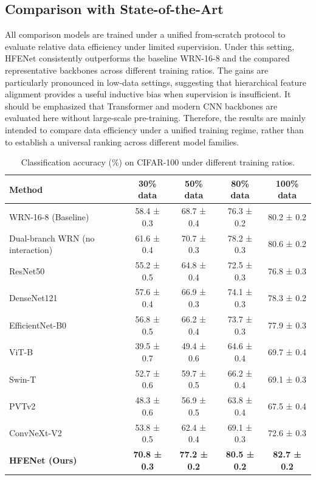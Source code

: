 \documentclass[pdflatex,sn-mathphys-num]{sn-jnl}
\theoremstyle{thmstyleone}%
\theoremstyle{thmstyletwo}%
\theoremstyle{thmstylethree}%
\begin{document}
\subsection{Comparison with State-of-the-Art}
All comparison models are trained under a unified from-scratch protocol to evaluate relative data efficiency under limited supervision. 
Under this setting, HFENet consistently outperforms the baseline WRN-16-8 and the compared representative backbones across different training ratios. 
The gains are particularly pronounced in low-data settings, suggesting that hierarchical feature alignment provides a useful inductive bias when supervision is insufficient. 
It should be emphasized that Transformer and modern CNN backbones are evaluated here without large-scale pre-training. 
Therefore, the results are mainly intended to compare data efficiency under a unified training regime, rather than to establish a universal ranking across different model families.

\begin{table}[htbp]
    \centering
    \caption{Classification accuracy (\%) on CIFAR-100 under different training ratios.}
    \label{tab:cifar100_data_ratio}
    \begin{tabular}{@{}lcccc@{}}
    \toprule
    \textbf{Method} & \textbf{30\% data} & \textbf{50\% data} & \textbf{80\% data} & \textbf{100\% data} \\
    \midrule
    WRN-16-8 (Baseline) & 58.4 ± 0.3 & 68.7 ± 0.4 & 76.3 ± 0.2 & 80.2 ± 0.2 \\
    Dual-branch WRN (no interaction) & 61.6 ± 0.4 & 70.7 ± 0.3 & 78.2 ± 0.3 & 80.6 ± 0.2 \\
    ResNet50 & 55.2 ± 0.5 & 64.8 ± 0.4 & 72.5 ± 0.3 & 76.8 ± 0.3 \\
    DenseNet121 & 57.6 ± 0.4 & 66.9 ± 0.3 & 74.1 ± 0.3 & 78.3 ± 0.2 \\
    EfficientNet-B0 & 56.8 ± 0.5 & 66.2 ± 0.4 & 73.7 ± 0.3 & 77.9 ± 0.3 \\
    ViT-B & 39.5 ± 0.7 & 49.4 ± 0.6 & 64.6 ± 0.4 & 69.7 ± 0.4 \\
    Swin-T & 52.7 ± 0.6 & 59.7 ± 0.5 & 66.2 ± 0.4 & 69.1 ± 0.3 \\
    PVTv2 & 48.3 ± 0.6 & 56.9 ± 0.5 & 63.8 ± 0.4 & 67.5 ± 0.4 \\
    ConvNeXt-V2 & 53.8 ± 0.5 & 62.4 ± 0.4 & 69.1 ± 0.3 & 72.6 ± 0.3 \\
    \hline
    \textbf{HFENet (Ours)} & \textbf{70.8 ± 0.3} & \textbf{77.2 ± 0.2} & \textbf{80.5 ± 0.2} & \textbf{82.7 ± 0.2} \\
    \bottomrule
    \end{tabular}
\end{table}
\end{document}
